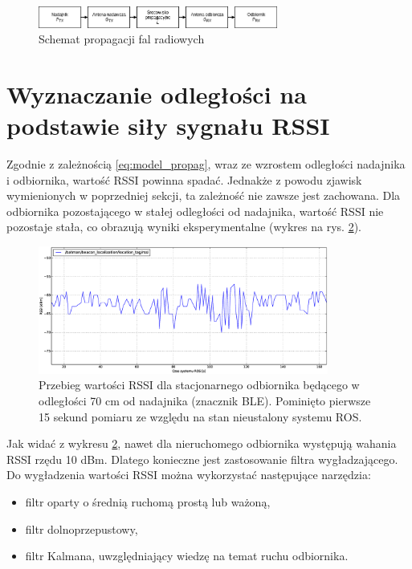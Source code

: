 \begin{figure}[H]
\centering
\includegraphics[width=0.7\textwidth]{img/propagacja-fal.png}
\caption{Schemat propagacji fal radiowych}
\label{fig:propagacja-fal}
\end{figure}

\section{Wyznaczanie odległości na podstawie siły sygnału RSSI}
\label{sec:rssi-odleglosc}
Zgodnie z zależnością \ref{eq:model_propag}, wraz ze wzrostem odległości nadajnika i odbiornika, wartość RSSI powinna spadać. Jednakże z powodu zjawisk wymienionych w poprzedniej sekcji, ta zależność nie zawsze jest zachowana. Dla odbiornika pozostającego w stałej odległości od nadajnika, wartość RSSI nie pozostaje stała, co obrazują wyniki eksperymentalne (wykres na rys. \ref{fig:rssi-stacjonarne}). 

\begin{figure}[H]
\centering
\includegraphics[width=0.85\textwidth]{img/rssi_stacjonarne.eps}
\caption{Przebieg wartości RSSI dla stacjonarnego odbiornika będącego w odległości 70 cm od nadajnika (znacznik BLE). Pominięto pierwsze 15 sekund pomiaru ze względu na stan nieustalony systemu ROS.}
\label{fig:rssi-stacjonarne}
\end{figure}

Jak widać z wykresu \ref{fig:rssi-stacjonarne}, nawet dla nieruchomego odbiornika występują wahania RSSI rzędu 10 dBm. Dlatego konieczne jest zastosowanie filtra wygładzającego. Do wygładzenia wartości RSSI można wykorzystać następujące narzędzia:
\begin{itemize}
 \item filtr oparty o średnią ruchomą prostą lub ważoną,
 \item filtr dolnoprzepustowy,
 \item filtr Kalmana, uwzględniający wiedzę na temat ruchu odbiornika.
\end{itemize}

